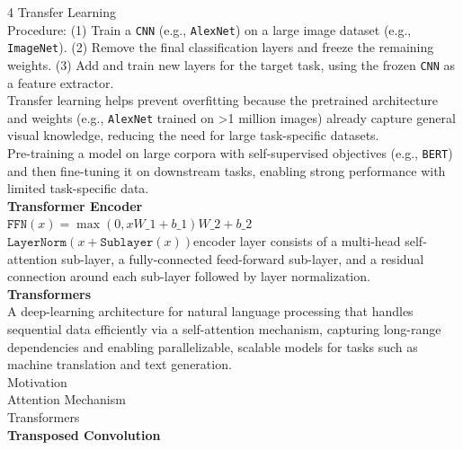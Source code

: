\documentclass[8pt]{extarticle}
\begin{document}
\begin{multicols}{4}
Transfer Learning\\
Procedure: (1) Train a \texttt{CNN} (e.g., \texttt{AlexNet}) on a large image dataset (e.g., \texttt{ImageNet}). (2) Remove the final classification layers and freeze the remaining weights. (3) Add and train new layers for the target task, using the frozen \texttt{CNN} as a feature extractor.\\
Transfer learning helps prevent overfitting because the pretrained architecture and weights (e.g., \texttt{AlexNet} trained on >1 million images) already capture general visual knowledge, reducing the need for large task-specific datasets.\\
Pre-training a model on large corpora with self-supervised objectives (e.g., \texttt{BERT}) and then fine-tuning it on downstream tasks, enabling strong performance with limited task-specific data.\\
\vspace{2pt}\textbf{Transformer Encoder}\\
$\texttt{FFN}(x) = \max(0, x W\_1 + b\_1) W\_2 + b\_2$\\
$\texttt{LayerNorm}(x + \texttt{Sublayer}(x))$\Each encoder layer consists of a multi-head self-attention sub-layer, a fully-connected feed-forward sub-layer, and a residual connection around each sub-layer followed by layer normalization.\\
\vspace{2pt}\textbf{Transformers}\\
A deep-learning architecture for natural language processing that handles sequential data efficiently via a self-attention mechanism, capturing long-range dependencies and enabling parallelizable, scalable models for tasks such as machine translation and text generation.\\
Motivation\\
Attention Mechanism\\
Transformers\\
\vspace{2pt}\textbf{Transposed Convolution}\\


\end{multicols}
\end{document}
